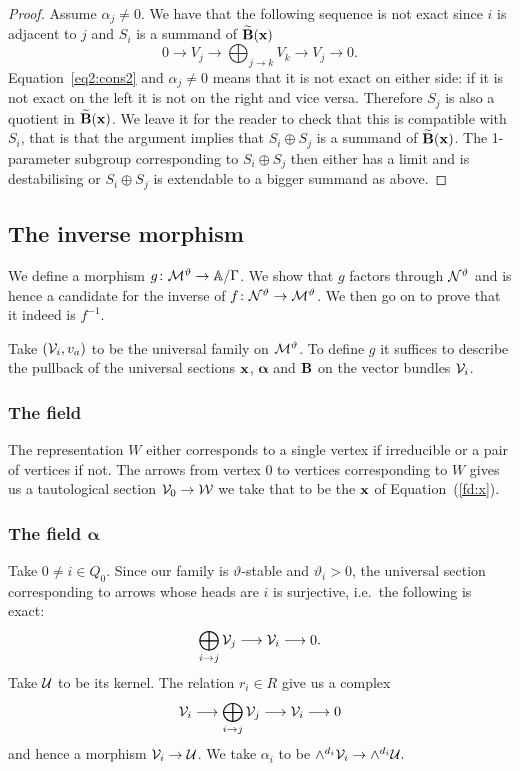 \documentclass{amsart}
\newcommand{\balpha}{\boldsymbol{\alpha}}
\theoremstyle{definition}
\begin{document}
\begin{proof}
Assume $\alpha_j \neq 0$.
We have that the following sequence is not exact since $i$ is adjacent to $j$ and $S_i$ is a summand of $\widetilde{\mathbf{B}}(\mathbf{x})$
$$0 \longrightarrow V_j \longrightarrow \bigoplus_{j \rightarrow k} V_k \longrightarrow V_j \longrightarrow 0.$$
Equation~\ref{eq2:cons2} and $\alpha_j \neq 0$ means that it is not exact on either side: if it is not exact on the left it is not on the right and vice versa.
Therefore $S_j$ is also a quotient in $\widetilde{\mathbf{B}}(\mathbf{x})$.
We leave it for the reader to check that this is compatible with $S_i$, that is that the argument implies that $S_i \oplus S_j$ is a summand of $\widetilde{\mathbf{B}}(\mathbf{x})$.
The 1-parameter subgroup corresponding to $S_i \oplus S_j$ then either has a limit and is destabilising or $S_i \oplus S_j$ is extendable to a bigger summand as above.
\end{proof}

\subsection{The inverse morphism}

We define a morphism  $g \colon \mathcal{M}^\vartheta \rightarrow \mathbb{A}/\Gamma$.
We show that $g$ factors through $\mathcal{N}^\vartheta$ and is hence a candidate for the inverse of $f \colon \mathcal{N}^\vartheta \rightarrow \mathcal{M}^\vartheta$.
We then go on to prove that it indeed is $f^{-1}$.

Take $(\mathcal{V}_i, v_a)$ to be the universal family on $\mathcal{M}^\vartheta$.
To define $g$ it suffices to describe the pullback of the universal sections $\mathbf{x}$, $\balpha$ and $\mathbf{B}$ on the vector bundles $\mathcal{V}_i$.

\subsubsection{The field \bfx}

The representation $W$ either corresponds to a single vertex if irreducible or a pair of vertices if not.
The arrows from vertex $0$ to vertices corresponding to $W$ gives us a tautological section $\mathcal{V}_0 \rightarrow \mathcal{W}$ we take that to be the $\mathbf{x}$ of Equation~(\ref{fd:x}).

\subsubsection{The field $\balpha$}\label{sssc:alpha}

Take $0 \neq i \in Q_0$.
Since our family is $\vartheta$-stable and $\vartheta_i>0$, the universal section corresponding to arrows whose heads are $i$ is surjective, i.e.\ the following is exact:
\begin{equation}\label{eq:k}
    \bigoplus_{i \rightarrow j} \mathcal{V}_j \longrightarrow \mathcal{V}_i \longrightarrow 0.
\end{equation}
Take $\mathcal{U}$ to be its kernel.
The relation $r_i \in R$ give us a complex
$$\mathcal{V}_i \longrightarrow \bigoplus_{i \rightarrow j} \mathcal{V}_j \longrightarrow \mathcal{V}_i \longrightarrow 0$$
and hence a morphism $\mathcal{V}_i \rightarrow \mathcal{U}$.
We take $\alpha_i$ to be $\wedge^{d_i} \mathcal{V}_i \rightarrow \wedge^{d_i}\mathcal{U}.$
\end{document}
